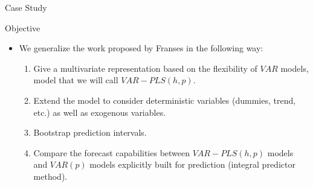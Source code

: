 \documentclass{beamer}
\newcommand{\?}{?`}
\begin{document}
\begin{frame}{Case Study}
  \begin{figure}[htbp]
\end{figure}
\end{frame}


\begin{frame}{Objective}
  \begin{itemize}
    \item We generalize the work proposed by Franses in the following way:
    \bigskip

      \begin{enumerate}
      \item Give a multivariate representation based on the flexibility of $VAR$ models, model that we will call $VAR-PLS(h,p)$.
      \item Extend the model to consider deterministic variables (dummies, trend, etc.) as well as exogenous variables.
      \item Bootstrap prediction intervals.
      \item Compare the forecast capabilities between $VAR-PLS(h,p)$ models and $VAR(p)$ models explicitly built for prediction
      (integral predictor method).
            \end{enumerate}
  \end{itemize}
\end{frame}
\end{document}
